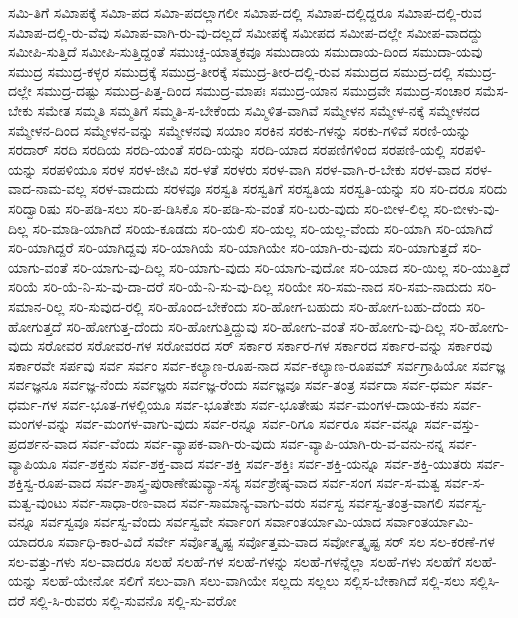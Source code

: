 {ಸಮಿ-ತಿಗೆ
ಸಮಿಾಪಕ್ಕೆ
ಸಮಿಾ-ಪದ
ಸಮಿಾ-ಪದಲ್ಲಾಗಲೀ
ಸಮಿಾಪ-ದಲ್ಲಿ
ಸಮಿಾಪ-ದಲ್ಲಿದ್ದರೂ
ಸಮಿಾಪ-ದಲ್ಲಿ-ರುವ
ಸಮಿಾಪ-ದಲ್ಲಿ-ರು-ವೆವು
ಸಮಿಾಪ-ವಾಗಿ-ರು-ವು-ದಲ್ಲದೆ
ಸಮೀಪಕ್ಕೆ
ಸಮೀಪದ
ಸಮೀಪ-ದಲ್ಲೇ
ಸಮೀಪ-ವಾದದ್ದು
ಸಮೀಪಿ-ಸುತ್ತಿದೆ
ಸಮೀಪಿ-ಸುತ್ತಿದ್ದಂತೆ
ಸಮುಚ್ಚ-ಯಾತ್ಮಕವೂ
ಸಮುದಾಯ
ಸಮುದಾಯ-ದಿಂದ
ಸಮುದಾ-ಯವು
ಸಮುದ್ರ
ಸಮುದ್ರ-ಕಳ್ಳರ
ಸಮುದ್ರಕ್ಕೆ
ಸಮುದ್ರ-ತೀರಕ್ಕೆ
ಸಮುದ್ರ-ತೀರ-ದಲ್ಲಿ-ರುವ
ಸಮುದ್ರದ
ಸಮುದ್ರ-ದಲ್ಲಿ
ಸಮುದ್ರ-ದಲ್ಲೇ
ಸಮುದ್ರ-ದಷ್ಟು
ಸಮುದ್ರ-ಪಿತ್ತ-ದಿಂದ
ಸಮುದ್ರ-ಮಾಪಃ
ಸಮುದ್ರ-ಯಾನ
ಸಮುದ್ರವೇ
ಸಮುದ್ರ-ಸಂಚಾರ
ಸಮೆಸ-ಬೇಕು
ಸಮೇತ
ಸಮ್ಮತಿ
ಸಮ್ಮತಿಗೆ
ಸಮ್ಮತಿ-ಸ-ಬೇಕೆಂದು
ಸಮ್ಮಿಳಿತ-ವಾಗಿವೆ
ಸಮ್ಮೇಳನ
ಸಮ್ಮೇಳ-ನಕ್ಕೆ
ಸಮ್ಮೇಳನದ
ಸಮ್ಮೇಳನ-ದಿಂದ
ಸಮ್ಮೇಳನ-ವನ್ನು
ಸಮ್ಮೇಳನವು
ಸಯಾಂ
ಸರಕಿನ
ಸರಕು-ಗಳನ್ನು
ಸರಕು-ಗಳಿವೆ
ಸರಣಿ-ಯನ್ನು
ಸರದಾರ್
ಸರದಿ
ಸರದಿಯ
ಸರದಿ-ಯಂತೆ
ಸರದಿ-ಯನ್ನು
ಸರದಿ-ಯಾದ
ಸರಪಣಿಗಳಿಂದ
ಸರಪಣಿ-ಯಲ್ಲಿ
ಸರಪಳಿ-ಯನ್ನು
ಸರಪಳಿಯೂ
ಸರಳ
ಸರಳ-ಜೀವಿ
ಸರ-ಳತೆ
ಸರಳರು
ಸರಳ-ವಾಗಿ
ಸರಳ-ವಾಗಿ-ರ-ಬೇಕು
ಸರಳ-ವಾದ
ಸರಳ-ವಾದ-ನಾಮ-ವಲ್ಲ
ಸರಳ-ವಾದುದು
ಸರಳವೂ
ಸರಸ್ವತಿ
ಸರಸ್ವತಿಗೆ
ಸರಸ್ವತಿಯ
ಸರಸ್ವತಿ-ಯನ್ನು
ಸರಿ
ಸರಿ-ದರೂ
ಸರಿದು
ಸರಿದ್ವಾರಿಷು
ಸರಿ-ಪಡಿ-ಸಲು
ಸರಿ-ಪ-ಡಿಸಿಕೊ
ಸರಿ-ಪಡಿ-ಸು-ವಂತೆ
ಸರಿ-ಬರು-ವುದು
ಸರಿ-ಬೀಳ-ಲಿಲ್ಲ
ಸರಿ-ಬೀಳು-ವು-ದಿಲ್ಲ
ಸರಿ-ಮಾಡಿ-ಯಾಗಿದೆ
ಸರಿಯ-ಕೂಡದು
ಸರಿ-ಯಲಿ
ಸರಿ-ಯಲ್ಲ
ಸರಿ-ಯಲ್ಲ-ವೆಂದು
ಸರಿ-ಯಾಗಿ
ಸರಿ-ಯಾಗಿದೆ
ಸರಿ-ಯಾಗಿದ್ದರೆ
ಸರಿ-ಯಾಗಿದ್ದವು
ಸರಿ-ಯಾಗಿಯೆ
ಸರಿ-ಯಾಗಿಯೇ
ಸರಿ-ಯಾಗಿ-ರು-ವುದು
ಸರಿ-ಯಾಗುತ್ತದೆ
ಸರಿ-ಯಾಗು-ವಂತೆ
ಸರಿ-ಯಾಗು-ವು-ದಿಲ್ಲ
ಸರಿ-ಯಾಗು-ವುದು
ಸರಿ-ಯಾಗು-ವುದೋ
ಸರಿ-ಯಾದ
ಸರಿ-ಯಿಲ್ಲ
ಸರಿ-ಯುತ್ತಿದೆ
ಸರಿಯೆ
ಸರಿ-ಯೆ-ನಿ-ಸು-ವು-ದಾ-ದರೆ
ಸರಿ-ಯೆ-ನಿ-ಸು-ವು-ದಿಲ್ಲ
ಸರಿಯೇ
ಸರಿ-ಸಮ-ನಾದ
ಸರಿ-ಸಮ-ನಾದುದು
ಸರಿ-ಸಮಾನ-ರಿಲ್ಲ
ಸರಿ-ಸುವುದ-ರಲ್ಲಿ
ಸರಿ-ಹೊಂದ-ಬೇಕೆಂದು
ಸರಿ-ಹೋಗ-ಬಹುದು
ಸರಿ-ಹೋಗ-ಬಹು-ದೆಂದು
ಸರಿ-ಹೋಗುತ್ತದೆ
ಸರಿ-ಹೋಗುತ್ತ-ದೆಂದು
ಸರಿ-ಹೋಗುತ್ತಿದ್ದುವು
ಸರಿ-ಹೋಗು-ವಂತೆ
ಸರಿ-ಹೋಗು-ವು-ದಿಲ್ಲ
ಸರಿ-ಹೋಗು-ವುದು
ಸರೋವರ
ಸರೋವರ-ಗಳ
ಸರೋವರದ
ಸರ್
ಸರ್ಕಾರ
ಸರ್ಕಾರ-ಗಳ
ಸರ್ಕಾರದ
ಸರ್ಕಾರ-ವನ್ನು
ಸರ್ಕಾರವು
ಸರ್ಕಾರವೇ
ಸರ್ಪವು
ಸರ್ವ
ಸರ್ವಂ
ಸರ್ವ-ಕಲ್ಯಾಣ-ರೂಪ-ನಾದ
ಸರ್ವ-ಕಲ್ಯಾಣ-ರೂಪಮ್
ಸರ್ವಗ್ರಾಹಿಯೋ
ಸರ್ವಜ್ಞ
ಸರ್ವಜ್ಞನೂ
ಸರ್ವಜ್ಞ-ನೆಂದು
ಸರ್ವಜ್ಞರು
ಸರ್ವಜ್ಞ-ರೆಂದು
ಸರ್ವಜ್ಞವೂ
ಸರ್ವ-ತಂತ್ರ
ಸರ್ವದಾ
ಸರ್ವ-ಧರ್ಮ
ಸರ್ವ-ಧರ್ಮ-ಗಳ
ಸರ್ವ-ಭೂತ-ಗಳಲ್ಲಿಯೂ
ಸರ್ವ-ಭೂತೇಶು
ಸರ್ವ-ಭೂತೇಷು
ಸರ್ವ-ಮಂಗಳ-ದಾಯ-ಕನು
ಸರ್ವ-ಮಂಗಳ-ವನ್ನು
ಸರ್ವ-ಮಂಗಳ-ವಾಗು-ವುದು
ಸರ್ವ-ರನ್ನೂ
ಸರ್ವ-ರಿಗೂ
ಸರ್ವರೂ
ಸರ್ವ-ವನ್ನೂ
ಸರ್ವ-ವಸ್ತು-ಪ್ರದರ್ಶನ-ವಾದ
ಸರ್ವ-ವೆಂದು
ಸರ್ವ-ವ್ಯಾಪಕ-ವಾಗಿ-ರು-ವುದು
ಸರ್ವ-ವ್ಯಾಪಿ-ಯಾಗಿ-ರು-ವ-ವನು-ನನ್ನ
ಸರ್ವ-ವ್ಯಾಪಿಯೂ
ಸರ್ವ-ಶಕ್ತನು
ಸರ್ವ-ಶಕ್ತ-ವಾದ
ಸರ್ವ-ಶಕ್ತಿ
ಸರ್ವ-ಶಕ್ತಿಃ
ಸರ್ವ-ಶಕ್ತಿ-ಯನ್ನೂ
ಸರ್ವ-ಶಕ್ತಿ-ಯುತರು
ಸರ್ವ-ಶಕ್ತಿಸ್ವ-ರೂಪ-ವಾದ
ಸರ್ವ-ಶಾಸ್ತ್ರ-ಪುರಾಣೇಷುವ್ಯಾ-ಸಸ್ಯ
ಸರ್ವಶ್ರೇಷ್ಠ-ವಾದ
ಸರ್ವ-ಸಂಗ
ಸರ್ವ-ಸ-ಮತ್ವ
ಸರ್ವ-ಸ-ಮತ್ವ-ವುಂಟು
ಸರ್ವ-ಸಾಧಾ-ರಣ-ವಾದ
ಸರ್ವ-ಸಾಮಾನ್ಯ-ವಾಗು-ವರು
ಸರ್ವಸ್ವ
ಸರ್ವಸ್ವ-ತಂತ್ರ-ವಾಗಲಿ
ಸರ್ವಸ್ವ-ವನ್ನೂ
ಸರ್ವಸ್ವವೂ
ಸರ್ವಸ್ವ-ವೆಂದು
ಸರ್ವಸ್ವವೇ
ಸರ್ವಾಂಗ
ಸರ್ವಾಂತರ್ಯಾಮಿ-ಯಾದ
ಸರ್ವಾಂತರ್ಯಾಮಿ-ಯಾದರೂ
ಸರ್ವಾಧಿ-ಕಾರ-ವಿದೆ
ಸರ್ವೇ
ಸರ್ವೊತ್ಕೃಷ್ಟ
ಸರ್ವೊತ್ತಮ-ವಾದ
ಸರ್ವೋತ್ಕೃಷ್ಟ
ಸರ್
ಸಲ
ಸಲ-ಕರಣೆ-ಗಳ
ಸಲ-ವತ್ತು-ಗಳು
ಸಲ-ವಾದರೂ
ಸಲಹೆ
ಸಲಹೆ-ಗಳ
ಸಲಹೆ-ಗಳನ್ನು
ಸಲಹೆ-ಗಳನ್ನೆಲ್ಲಾ
ಸಲಹೆ-ಗಳು
ಸಲಹೆಗೆ
ಸಲಹೆ-ಯನ್ನು
ಸಲಹೆ-ಯೇನೋ
ಸಲಿಗೆ
ಸಲು-ವಾಗಿ
ಸಲು-ವಾಗಿಯೇ
ಸಲ್ಲದು
ಸಲ್ಲಲು
ಸಲ್ಲಿಸ-ಬೇಕಾಗಿದೆ
ಸಲ್ಲಿ-ಸಲು
ಸಲ್ಲಿಸಿ-ದರೆ
ಸಲ್ಲಿ-ಸಿ-ರುವರು
ಸಲ್ಲಿ-ಸುವನೊ
ಸಲ್ಲಿ-ಸು-ವರೋ
}
